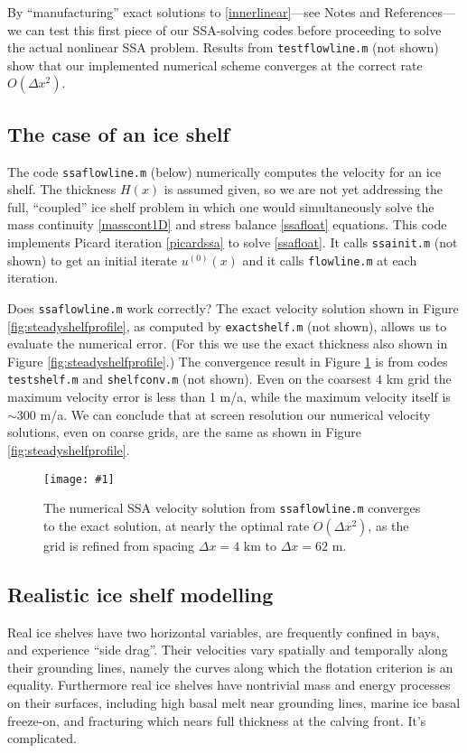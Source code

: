 \documentclass[letterpaper,final,12pt,reqno]{amsart}
\newcommand{\minput}[1]{
\vspace{0.8cm}
\VerbatimInput[frame=single,framesep=3mm,label=\fbox{\normalsize \textsl{\,#1.m\,}},fontfamily=courier,fontsize=\footnotesize]{tmp/#1.slim.m}
\vspace{0.5cm}
}
\newcommand{\onefigsize}[3]{
\begin{figure}[ht]
\centering
\texttt{[image: \#1]}
\caption{#2}
\label{fig:#1}
\end{figure}}
\newcommand{\onefig}[2]{\onefigsize{#1}{#2}{3.0in}}
\begin{document}
\minput{flowline}

By ``manufacturing'' exact solutions to \eqref{innerlinear}---see Notes and References---we can test this first piece of our SSA-solving codes before proceeding to solve the actual nonlinear SSA problem.   Results from \texttt{testflowline.m} (not shown) show that our implemented numerical scheme converges at the correct rate $O(\Delta x^2)$.

\subsection*{The case of an ice shelf}  The code \texttt{ssaflowline.m} (below) numerically computes the velocity for an ice shelf.  The thickness $H(x)$ is assumed given, so we are not yet addressing the full, ``coupled'' ice shelf problem in which one would simultaneously solve the mass continuity \eqref{masscont1D} and stress balance \eqref{ssafloat} equations.  This code implements Picard iteration \eqref{picardssa} to solve \eqref{ssafloat}.  It calls \texttt{ssainit.m} (not shown) to get an initial iterate $u^{(0)}(x)$ and it calls \texttt{flowline.m} at each iteration.

\minput{ssaflowline}

Does \texttt{ssaflowline.m} work correctly?  The exact velocity solution shown in Figure \ref{fig:steadyshelfprofile}, as computed by \texttt{exactshelf.m} (not shown), allows us to evaluate the numerical error.  (For this we use the exact thickness also shown in Figure \ref{fig:steadyshelfprofile}.)  The convergence result in Figure \ref{fig:shelfconv} is from codes \texttt{testshelf.m} and \texttt{shelfconv.m} (not shown).  Even on the coarsest $4$ km grid the maximum velocity error is less than 1 m/a, while the maximum velocity itself is $\sim 300$ m/a.  We can conclude that at screen resolution our numerical velocity solutions, even on coarse grids, are the same as shown in Figure \ref{fig:steadyshelfprofile}.

\onefig{shelfconv}{The numerical SSA velocity solution from \texttt{ssaflowline.m} converges to the exact solution, at nearly the optimal rate $O(\Delta x^2)$, as the grid is refined from spacing $\Delta x=4$ km to $\Delta x=62$ m.}

\subsection*{Realistic ice shelf modelling}  Real ice shelves have two horizontal variables, are frequently confined in bays, and experience ``side drag''.  Their velocities vary spatially and temporally along their grounding lines, namely the curves along which the flotation criterion is an equality.  Furthermore real ice shelves have nontrivial mass and energy processes on their surfaces, including high basal melt near grounding lines, marine ice basal freeze-on, and fracturing which nears full thickness at the calving front.  It's complicated.
\end{document}
